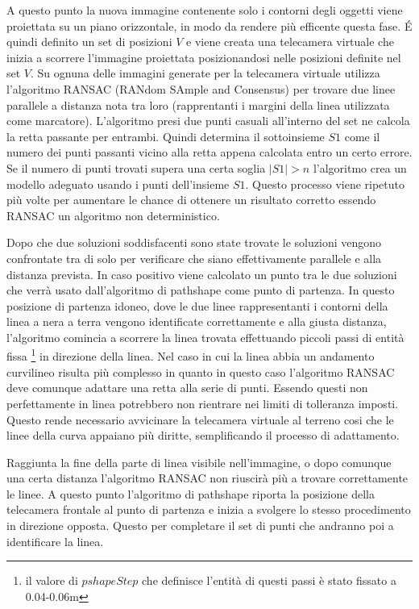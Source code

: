 	A questo punto la nuova immagine contenente solo i contorni degli oggetti viene proiettata su un piano orizzontale, in modo da rendere più efficente questa fase. \'E quindi definito un set di posizioni $V$ e viene creata una telecamera virtuale che inizia a scorrere l'immagine proiettata posizionandosi nelle posizioni definite nel set $V$. Su ognuna delle immagini generate per la telecamera virtuale utilizza l'algoritmo RANSAC\cite{ransac} (RANdom SAmple and Consensus) per trovare due linee parallele a distanza nota tra loro (rapprentanti i margini della linea utilizzata come marcatore). L'algoritmo presi due punti casuali all'interno del set ne calcola la retta passante per entrambi. Quindi determina il sottoinsieme $S1$ come il numero dei punti passanti vicino alla retta appena calcolata entro un certo errore. Se il numero di punti trovati supera una certa soglia $|S1|>n$ l'algoritmo crea un modello adeguato usando i punti dell'insieme $S1$. Questo processo viene ripetuto più volte per aumentare le chance di ottenere un risultato corretto essendo RANSAC un algoritmo non deterministico.

	Dopo che due soluzioni soddisfacenti sono state trovate le soluzioni vengono confrontate tra di solo per verificare che siano effettivamente parallele e alla distanza prevista. In caso positivo viene calcolato un punto tra le due soluzioni che verrà usato dall'algoritmo di pathshape come punto di partenza. In questo posizione di partenza idoneo, dove le due linee rappresentanti i contorni della linea a nera a terra vengono identificate correttamente e alla giusta distanza, l'algoritmo comincia a scorrere la linea trovata effettuando piccoli passi di entità fissa \footnote{il valore di $pshapeStep$ che definisce l'entità di questi passi è stato fissato a 0.04-0.06m} in direzione della linea. Nel caso in cui la linea abbia un andamento curvilineo risulta più complesso in quanto in questo caso l'algoritmo RANSAC deve comunque adattare una retta alla serie di punti. Essendo questi non perfettamente in linea potrebbero non rientrare nei limiti di tolleranza imposti. Questo rende necessario avvicinare la telecamera virtuale al terreno cosi che le linee della curva appaiano più diritte, semplificando il processo di adattamento.

	Raggiunta la fine della parte di linea visibile nell'immagine, o dopo comunque una certa distanza l'algoritmo RANSAC non riuscirà più a trovare correttamente le linee. A questo punto l'algoritmo di pathshape riporta la posizione della telecamera frontale al punto di partenza e inizia a svolgere lo stesso procedimento in direzione opposta. Questo per completare il set di punti che andranno poi a identificare la linea.
